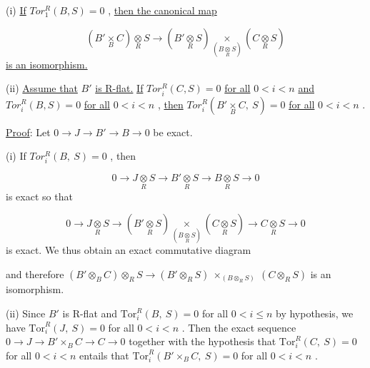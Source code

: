 (i)  \underline{If}  $Tor^{R}_{1}(B,S) = 0$  , \underline{then the canonical map}

\begin{equation*}
(B'\underset{B}{\times} C) \underset{R}{\otimes} S \to (B'\underset{R}{\otimes} S) \underset{(B \underset{R}{\otimes} S)}{\times} (C \underset{R}{\otimes} S)
\end{equation*}
\underline{is an isomorphism.}

(ii)  \underline{Assume that}  $B'$  \underline{is R-flat.} \underline{If}  $Tor^{R}_{i}(C,S) = 0$  \underline{for all}  $0 < i < n$  \underline{and}  $Tor^{R}_{i}(B,S) = 0$  \underline{for all}  $0 < i < n$  , \underline{then}  $Tor^{R}_{i}(B'\underset{B}{\times}C,\ S) = 0$  \underline{for all}  $0 < i < n$  .

\underline{Proof}:  Let  $0 \to J \to B' \to B \to 0$  be exact.

(i)  If  $Tor^{R}_{i}(B,\ S) = 0$  , then

\begin{equation*}
0 \to J\underset{R}{\otimes}S \to B'\underset{R}{\otimes}S \to B\underset{R}{\otimes}S \to 0
\end{equation*}
is exact so that

\begin{equation*}
0 \to J\underset{R}{\otimes}S \to (B'\underset{R}{\otimes}S) \underset{(B\underset{R}{\otimes}S)}{\times} (C\underset{R}{\otimes}S) \to C\underset{R}{\otimes}S \to 0
\end{equation*}
is exact. We thus obtain an exact commutative diagram



and therefore $(B'\otimes_B C)\otimes_R S \to (B'\otimes_R S)\ \times_{(B\otimes_R S)}\ (C \otimes_R S)$  is an isomorphism.

(ii)  Since  $B'$  is R-flat and  $\mathrm{Tor}^R_i(B,\ S) = 0$  for all  $0 < i \leq n$   by hypothesis, we have  $\mathrm{Tor}^R_i(J,\ S) = 0$  for all  $0 < i < n$  . Then the exact sequence  $0 \to J \to B'\times_B C \to C \to 0$  together with the hypothesis that  $\mathrm{Tor}^R_i(C,\ S) = 0$  for all  $0 < i < n$  entails that  $\mathrm{Tor}^R_i(B'\times_B C,\ S) = 0$  for all  $0 < i < n$  .


